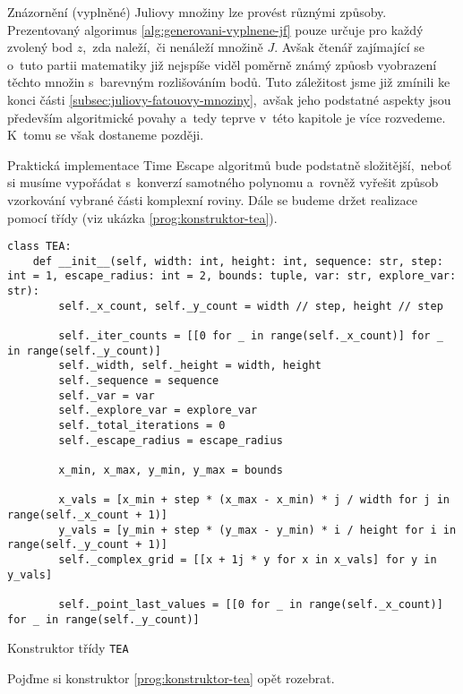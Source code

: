 Znázornění (vyplněné) Juliovy množiny lze provést různými způsoby. Prezentovaný algorimus \ref{alg:generovani-vyplnene-jf} pouze určuje pro každý zvolený bod $z$,~zda naleží,~či nenáleží množině $J$. Avšak čtenář zajímající se o~tuto partii matematiky již nejspíše viděl poměrně známý způosb vyobrazení těchto množin s~barevným rozlišováním bodů. Tuto záležitost jsme již zmínili ke konci části \ref{subsec:juliovy-fatouovy-mnoziny},~avšak jeho podstatné aspekty jsou především algoritmické povahy a~tedy teprve v~této kapitole je více rozvedeme. K~tomu se však dostaneme později.

Praktická implementace Time Escape algoritmů bude podstatně složitější,~neboť si musíme vypořádat s~konverzí samotného polynomu a~rovněž vyřešit způsob vzorkování vybrané části komplexní roviny. Dále se budeme držet realizace pomocí třídy (viz ukázka \ref{prog:konstruktor-tea}).
\begin{program}[h]
\begin{lstlisting}[style=python]
class TEA:
    def __init__(self, width: int, height: int, sequence: str, step: int = 1, escape_radius: int = 2, bounds: tuple, var: str, explore_var: str):
        self._x_count, self._y_count = width // step, height // step
        
        self._iter_counts = [[0 for _ in range(self._x_count)] for _ in range(self._y_count)]
        self._width, self._height = width, height
        self._sequence = sequence
        self._var = var
        self._explore_var = explore_var
        self._total_iterations = 0
        self._escape_radius = escape_radius

        x_min, x_max, y_min, y_max = bounds

        x_vals = [x_min + step * (x_max - x_min) * j / width for j in range(self._x_count + 1)]
        y_vals = [y_min + step * (y_max - y_min) * i / height for i in range(self._y_count + 1)]
        self._complex_grid = [[x + 1j * y for x in x_vals] for y in y_vals]

        self._point_last_values = [[0 for _ in range(self._x_count)] for _ in range(self._y_count)]
\end{lstlisting}
    \caption{Konstruktor třídy \texttt{TEA}}
    \label{prog:konstruktor-tea}
\end{program}
Pojďme si konstruktor \ref{prog:konstruktor-tea} opět rozebrat.

